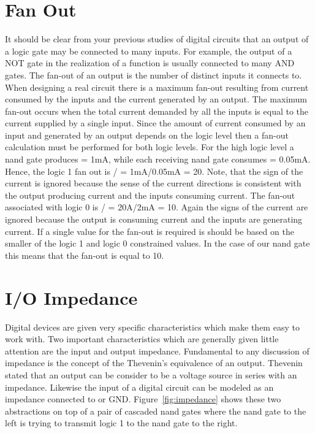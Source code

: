 \section{Fan Out}
It should be clear from your previous studies of digital circuits 
that an output of a logic gate may be connected to many inputs.  For
example, the output of a NOT gate in the \SOPmin realization of a 
function is usually connected to many AND gates.  The fan-out of an 
output is the number of distinct inputs it connects to.  When 
designing a real circuit there is a maximum fan-out
resulting from current consumed by the inputs and the current generated
by an output.  The maximum fan-out occurs when the total current demanded
by all the inputs is equal to the current supplied by a single input.  
Since the amount of current consumed by an input and generated by an
output depends on the logic level then a fan-out calculation must
be performed for both logic levels.  For the high logic level a nand
gate produces \IOH = 1mA, while each receiving nand gate consumes
\IIH = 0.05mA.  Hence, the logic 1 fan out is \IOH / \IIH = 1mA/0.05mA = 20.
Note, that the sign of the current is ignored because the sense of the 
current directions is consistent with
the output producing current and the inputs consuming current.  The fan-out 
associated with logic 0 is \IOL / \IIL = 20A/2mA = 10.  Again the signs
of the current are ignored because the output is consuming current and the
inputs are generating current.  If a single value for the fan-out 
is required is should be based on the smaller of the logic 1 and logic 0
constrained values.  In the case of our nand gate this means that 
the fan-out is equal to 10.


\section{I/O Impedance}
Digital devices are given very specific characteristics which make them
easy to work with.  Two important characteristics which are
generally given little attention are the input and output impedance.
Fundamental to any discussion of impedance is the concept of the
Thevenin's equivalence of an output.  Thevenin stated that an output
can be consider to be a voltage source in series with an impedance.
Likewise the input of a digital circuit can be modeled as an
impedance connected to \VCC or GND.  Figure~\ref{fig:impedance} shows 
these two abstractions on top of a pair of cascaded nand gates where
the nand gate to the left is trying to transmit logic 1 to the
nand gate to the right.

